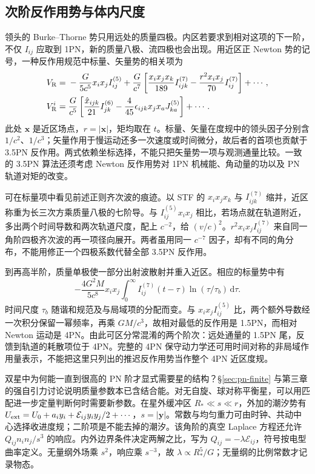 \subsection{次阶反作用势与体内尺度}

领头的 Burke--Thorne 势只用远处的质量四极。内区若要求到相对这项的下一阶，不仅 $I_{ij}$ 应取到 1PN，新的质量八极、流四极也会出现。用近区正 Newton 势的记号，一种反作用规范中标量、矢量势的相关项为
\begin{align*}
 V_{\rm R}={}&-\frac{G}{5c^5}x_i x_j I_{ij}^{(5)}
    +\frac{G}{c^7}
       \left[\frac{x_i x_j x_k}{189} I_{ijk}^{(7)}
          -\frac{r^2x_i x_j}{70} I_{ij}^{(7)}\right]+\cdots,\\
 V^i_{\rm R}={}&\frac{G}{c^5}
       \left[\frac{\hat x_{ijk}}{21} I_{jk}^{(6)}
                    -\frac{4}{45}\epsilon_{ijk}x_j x_a J_{ka}^{(5)}\right]+\cdots .
\end{align*}
此处 $\bm x$ 是近区场点，$r=|\bm x|$，矩均取在 $t$。标量、矢量在度规中的领头因子分别含 $1/c^2$、$1/c^3$；矢量作用于慢运动还多一次速度或时间微分，故后者的首项也贡献于 3.5PN 反作用。两式依赖坐标选择，不能只把矢量势一项与观测通量比较。一致的 3.5PN 算法还须考虑 Newton 反作用势对 1PN 机械能、角动量的功以及 PN 轨道对矩的改变。

可在标量项中看见前述正则齐次波的痕迹。以 STF 的 $x_i x_j x_k$ 与 $I_{ijk}^{(7)}$ 缩并，近区称重为长三次方乘质量八极的七阶导。与 $I_{ij}^{(5)}x_i x_j$ 相比，若场点就在轨道附近，多出两个时间导数和两次轨道尺度，配上 $c^{-2}$，给 $(v/c)^2$。$r^2x_ix_j I_{ij}^{(7)}$ 来自同一角阶四极齐次波的再一项径向展开。两者虽用同一 $c^{-7}$ 因子，却有不同的角分布，不能用修正一个四极系数代替全部 3.5PN 反作用。

到再高半阶，质量单极使一部分出射波散射并重入近区。相应的标量势中有
\[
 -\frac{4G^2M}{5c^8} x_i x_j
       \int_0^\infty I_{ij}^{(7)}(t-\tau)
              \ln(\tau/\tau_b)\,\mathrm d\tau .
\]
时间尺度 $\tau_b$ 随谐和规范及与局域项的分配而变。与 $x_i x_j I_{ij}^{(5)}$ 比，两个额外导数经一次积分保留一幂频率，再乘 $GM/c^3$，故相对最低的反作用是 1.5PN，而相对 Newton 运动是 4PN。由此可区分常混淆的两个阶次：远处通量的 1.5PN 尾，反馈到轨道的耗散项位于 4PN。完整的 4PN 保守动力学还可用时间对称的非局域作用量表示，不能把这里只列出的推迟反作用势当作整个 4PN 近区度规。

双星中为何能一直到很高的 PN 阶才显式需要星的结构？\S\ref{sec:pn-finite} 与第三章的强自引力讨论说明质量参数本已含结合能。对无自旋、球对称平衡星，可以用匹配进一步定量判断何时需要新参数。在星外缓冲区 $R_*\ll s\ll r$，外加的潮汐势有 $U_{\rm ext}=U_0+a_i y_i+\mathcal E_{ij}y_iy_j/2+\cdots$，$s=|\bm y|$。常数与均匀重力可由时钟、共动中心选择收进度规；二阶项是不能去掉的潮汐。该角阶的真空 Laplace 方程还允许 $Q_{ij}n_i n_j/s^3$ 的响应。内外边界条件决定两解之比，写为 $Q_{ij}=-\lambda\mathcal E_{ij}$，符号按电型曲率定义。无量纲外场乘 $s^2$，响应乘 $s^{-3}$，故 $\lambda\propto R_*^5/G$；无量纲的比例常数才记录物态。

